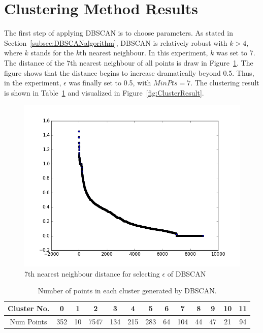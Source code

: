\section{Clustering Method Results}
\label{sec:clustering}
The first step of applying DBSCAN is to choose parameters. As stated in Section~\ref{subsec:DBSCANalgorithm}, DBSCAN is relatively robust with $k > 4$, where $k$ stands for the $k$th nearest neighbour. In this experiment, $k$ was set to 7. The distance of the $7$th nearest neighbour of all points is draw in Figure~\ref{fig:paramDBSCAN}. The figure shows that the distance begins to increase dramatically beyond 0.5. Thus, in the experiment, $\epsilon$ was finally set to 0.5, with $MinPts = 7$. The clustering result is shown in Table~\ref{tab:ClusterResult} and visualized in Figure~\ref{fig:ClusterResult}.
\begin{figure}[!ht]
	\begin{center}
		\includegraphics[width=\textwidth]{images/paramDBSCAN}
		\caption{7th nearest neighbour distance for selecting $\epsilon$ of DBSCAN}
		\label{fig:paramDBSCAN}
	\end{center}
\end{figure}

\begin{table}[!ht]
	\caption{Number of points in each cluster generated by DBSCAN.}
	\small
	\begin{center}
		\begin{tabular}{|c|c|c|c|c|c|c|c|c|c|c|c|c|}
			\hline
			Cluster No. &    0 & 1  & 2    & 3   & 4   & 5   & 6  & 7   & 8  & 9  & 10 & 11	\\ \hline
			Num Points  &  352 & 10 & 7547 & 134 & 215 & 283 & 64 & 104 & 44 & 47 & 21 & 94 \\
			\hline

		\end{tabular}
	\end{center}
	\label{tab:ClusterResult}
\end{table}

